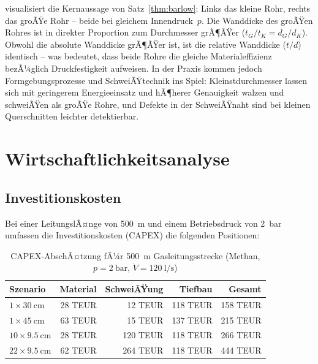 ﻿\documentclass[12pt,a4paper,twoside]{article}
\theoremstyle{plain}
\theoremstyle{definition}
\theoremstyle{remark}
\begin{document}
\noindent
{} visualisiert die Kernaussage von Satz~\ref{thm:barlow}:
Links das kleine Rohr, rechts das groÃŸe Rohr -- beide bei gleichem Innendruck~$p$.
Die Wanddicke des groÃŸen Rohres ist in direkter Proportion zum Durchmesser
grÃ¶ÃŸer ($t_G/t_K = d_G/d_K$).
Obwohl die absolute Wanddicke grÃ¶ÃŸer ist, ist die relative Wanddicke ($t/d$)
identisch -- was bedeutet, dass beide Rohre die gleiche Materialeffizienz
bezÃ¼glich Druckfestigkeit aufweisen.
In der Praxis kommen jedoch Formgebungsprozesse und SchweiÃŸ\-technik ins Spiel:
Kleinstdurchmesser lassen sich mit geringerem Energieeinsatz und hÃ¶herer
Genauigkeit walzen und schweiÃŸen als groÃŸe Rohre, und Defekte in der SchweiÃŸnaht
sind bei kleinen Querschnitten leichter detektierbar.

\section{Wirtschaftlichkeitsanalyse}
\label{sec:wirtschaft}

\subsection{Investitionskosten}
\label{ssec:capex}

Bei einer LeitungslÃ¤nge von \SI{500}{\metre} und einem Betriebsdruck von
\SI{2}{\bar} umfassen die Investitionskosten (CAPEX) die folgenden Positionen:

\begin{table}[htbp]
\centering
\caption{CAPEX-AbschÃ¤tzung fÃ¼r \SI{500}{\metre} Gasleitungsstrecke
         (Methan, $p = \SI{2}{\bar}$, $\dot{V} = \SI{120}{\litre\per\second}$)}
\label{tab:capex}
\begin{tabular}{@{}lrrrr@{}}
\toprule
Szenario & Material & SchweiÃŸung & Tiefbau & Gesamt \\
\midrule
$1 \times \SI{30}{\centi\metre}$         & 28 TEUR & 12 TEUR & 118 TEUR & 158 TEUR \\
$1 \times \SI{45}{\centi\metre}$         & 63 TEUR & 15 TEUR & 137 TEUR & 215 TEUR \\
$10 \times \SI{9.5}{\centi\metre}$       & 28 TEUR & 120 TEUR & 118 TEUR & 266 TEUR \\
$22 \times \SI{9.5}{\centi\metre}$       & 62 TEUR & 264 TEUR & 118 TEUR & 444 TEUR \\
\bottomrule
\end{tabular}
\end{table}
\end{document}

